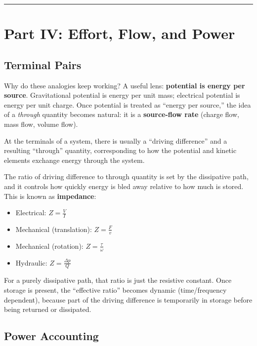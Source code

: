 \documentclass[
]{article}
\providecommand{\tightlist}{%
  \setlength{\itemsep}{0pt}\setlength{\parskip}{0pt}}
\begin{document}
\begin{center}\rule{0.5\linewidth}{0.5pt}\end{center}

\section{Part IV: Effort, Flow, and
Power}\label{part-iv-effort-flow-and-power}

\subsection{Terminal Pairs}\label{terminal-pairs}

Why do these analogies keep working? A useful lens: \textbf{potential is
energy per source}. Gravitational potential is energy per unit mass;
electrical potential is energy per unit charge. Once potential is
treated as ``energy per source,'' the idea of a \emph{through} quantity
becomes natural: it is a \textbf{source-flow rate} (charge flow, mass
flow, volume flow).

At the terminals of a system, there is usually a ``driving difference''
and a resulting ``through'' quantity, corresponding to how the potential
and kinetic elements exchange energy through the system.

The ratio of driving difference to through quantity is set by the
dissipative path, and it controls how quickly energy is bled away
relative to how much is stored. This is known as \textbf{impedance}:

\begin{itemize}
\tightlist
\item
  Electrical: \(Z = \frac{V}{I}\)
\item
  Mechanical (translation): \(Z = \frac{F}{v}\)
\item
  Mechanical (rotation): \(Z = \frac{\tau}{\omega}\)
\item
  Hydraulic: \(Z = \frac{\Delta p}{Q}\)
\end{itemize}

For a purely dissipative path, that ratio is just the resistive
constant. Once storage is present, the ``effective ratio'' becomes
dynamic (time/frequency dependent), because part of the driving
difference is temporarily in storage before being returned or
dissipated.

\subsection{Power Accounting}\label{power-accounting}
\end{document}
